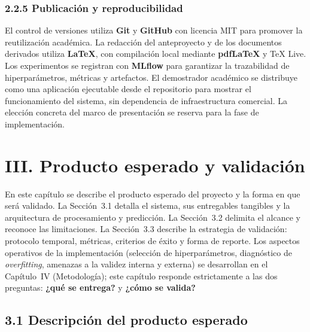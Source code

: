 \documentclass[12pt,letterpaper]{report}
\begin{document}
\subsection{2.2.5 Publicación y reproducibilidad}

El control de versiones utiliza \textbf{Git} y \textbf{GitHub} con licencia MIT para promover la reutilización académica. La redacción del anteproyecto y de los documentos derivados utiliza \textbf{\LaTeX}, con compilación local mediante \textbf{pdfLaTeX} y TeX Live. Los experimentos se registran con \textbf{MLflow} para garantizar la trazabilidad de hiperparámetros, métricas y artefactos. El demostrador académico se distribuye como una aplicación ejecutable desde el repositorio para mostrar el funcionamiento del sistema, sin dependencia de infraestructura comercial. La elección concreta del marco de presentación se reserva para la fase de implementación.

\clearpage

\chapter{III. Producto esperado y validación}

En este capítulo se describe el producto esperado del proyecto y la forma en que será validado. La Sección~3.1 detalla el sistema, sus entregables tangibles y la arquitectura de procesamiento y predicción. La Sección~3.2 delimita el alcance y reconoce las limitaciones. La Sección~3.3 describe la estrategia de validación: protocolo temporal, métricas, criterios de éxito y forma de reporte. Los aspectos operativos de la implementación (selección de hiperparámetros, diagnóstico de \textit{overfitting}, amenazas a la validez interna y externa) se desarrollan en el Capítulo~IV (Metodología); este capítulo responde estrictamente a las dos preguntas: \textbf{¿qué se entrega?} y \textbf{¿cómo se valida?}

\section{3.1 Descripción del producto esperado}
\end{document}
